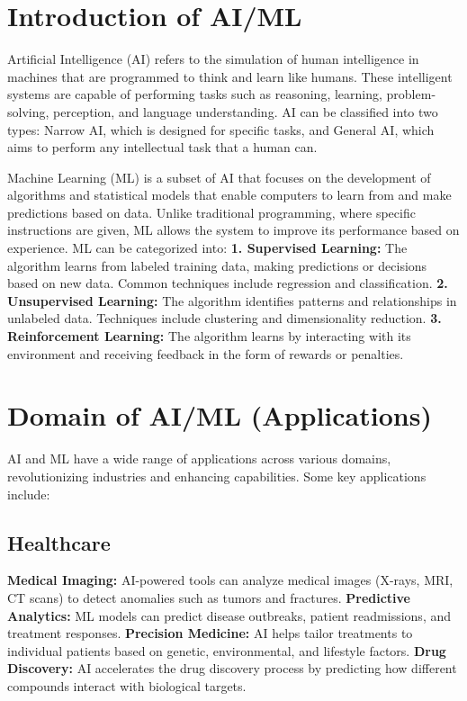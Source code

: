 \documentclass[a4paper,12pt]{report}
\begin{document}
    \section{Introduction of AI/ML}
    Artificial Intelligence (AI) refers to the simulation of human intelligence in machines that are programmed to think and learn like humans. These intelligent systems are capable of performing tasks such as reasoning, learning, problem-solving, perception, and language understanding. AI can be classified into two types: Narrow AI, which is designed for specific tasks, and General AI, which aims to perform any intellectual task that a human can.
    
    Machine Learning (ML) is a subset of AI that focuses on the development of algorithms and statistical models that enable computers to learn from and make predictions based on data. Unlike traditional programming, where specific instructions are given, ML allows the system to improve its performance based on experience. ML can be categorized into:
{}
    \newline\textbf{1. Supervised Learning:} The algorithm learns from labeled training data, making predictions or decisions based on new data. Common techniques include regression and classification.
    \newline\textbf{2. Unsupervised Learning:} The algorithm identifies patterns and relationships in unlabeled data. Techniques include clustering and dimensionality reduction.
    \newline\textbf{3. Reinforcement Learning:} The algorithm learns by interacting with its environment and receiving feedback in the form of rewards or penalties.
    \section{Domain of AI/ML (Applications)}
    AI and ML have a wide range of applications across various domains, revolutionizing industries and enhancing capabilities. Some key applications include:
    
    \subsection{Healthcare}
        \textbf{Medical Imaging:} AI-powered tools can analyze medical images (X-rays, MRI, CT scans) to detect anomalies such as tumors and fractures.
        \newline\textbf{Predictive Analytics:} ML models can predict disease outbreaks, patient readmissions, and treatment responses.
        \newline\textbf{Precision Medicine:} AI helps tailor treatments to individual patients based on genetic, environmental, and lifestyle factors.
        \newline\textbf{Drug Discovery:} AI accelerates the drug discovery process by predicting how different compounds interact with biological targets.
    
\end{document}
